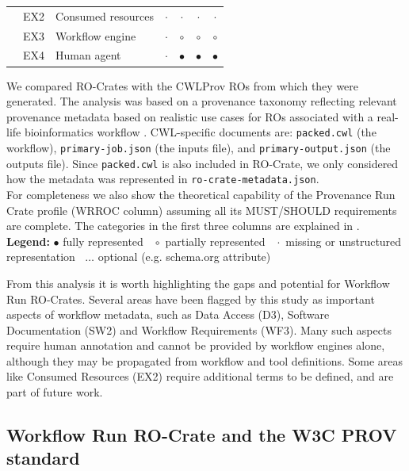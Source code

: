 \documentclass[10pt,letterpaper]{article}
\begin{document}
\begin{table}[!ht]
\begin{adjustwidth}{-1.4cm}{0in}
\begin{tabular}{r|l|l|c|c|c|c}
& EX2 & Consumed resources      & $\cdot$ & $\cdot$ & $\cdot$ & $\cdot$  \\ 
& EX3 & Workflow engine         & $\cdot$ & $\circ$ & $\circ$ & $\circ$  \\  
& EX4 & Human agent             & $\cdot$ & $\bullet$ & $\bullet$ & $\bullet$ \\ \hline
\end{tabular}
\begin{flushleft} We compared RO-Crates with the CWLProv ROs from which they were generated.
The analysis was based on a provenance taxonomy reflecting relevant provenance metadata based on realistic use cases for ROs associated with a real-life bioinformatics workflow \cite{De Wit 2022}.
CWL-specific documents are: \texttt{packed.cwl} (the workflow), \texttt{primary-job.json} (the inputs file), and \texttt{primary-output.json} (the outputs file).
Since \texttt{packed.cwl} is also included in RO-Crate, we only considered how the metadata was represented in \texttt{ro-crate-metadata.json}.\\
For completeness we also show the theoretical capability of the Provenance Run Crate profile (WRROC column) assuming all its MUST/SHOULD requirements are complete.
The categories in the first three columns are explained in \cite{De Wit 2022}.
\\
\textbf{Legend:} $\bullet$ fully represented  $\;\;\circ$ partially represented   $\;\;\cdot$ missing or unstructured representation $\;\;\dots$ optional (e.g. schema.org attribute)
\end{flushleft}
\label{analysis_table}
\end{adjustwidth}
\end{table}

From this analysis it is worth highlighting the gaps and potential for Workflow Run RO-Crates. Several areas have been flagged by this study as important aspects of workflow metadata, such as Data Access (D3), Software Documentation (SW2) and Workflow Requirements (WF3). Many such aspects require human annotation and cannot be provided by workflow engines alone, although they may be propagated from workflow and tool definitions. Some areas like Consumed Resources (EX2) require additional terms to be defined, and are part of future work.


\subsection{Workflow Run RO-Crate and the W3C PROV standard}
\end{document}

